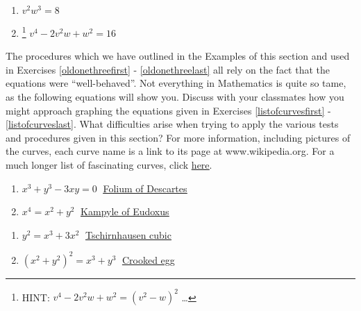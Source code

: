 \begin{multicols}{2}
\begin{enumerate}
\setcounter{enumi}{\value{HW}}

\item  $v^2w^3 = 8$
\item \hspace{-.1in}\footnote{HINT: $v^4 - 2v^2 w + w^2 = \left(v^2 - w \right)^2$ \ldots} $v^4 - 2v^2 w + w^2 = 16$  \label{vwlastrelation}

\setcounter{HW}{\value{enumi}}
\end{enumerate}
\end{multicols}

The procedures which we have outlined in the Examples of this section and used in Exercises \ref{oldonethreefirst} -  \ref{oldonethreelast} all rely on the fact that the equations were ``well-behaved''.  Not everything in Mathematics is quite so tame, as the following equations will show you.  Discuss with your classmates how you might approach graphing the equations given in Exercises \ref{listofcurvesfirst} - \ref{listofcurveslast}.  What difficulties arise when trying to apply the various tests and procedures given in this section?  For more information, including pictures of the curves, each curve name is a link to its page at www.wikipedia.org.  For a much longer list of fascinating curves, click \href{http://en.wikipedia.org/wiki/List_of_curves}{\underline{here}}.


\begin{multicols}{2}
\begin{enumerate}
\setcounter{enumi}{\value{HW}}

\item \label{listofcurvesfirst} $x^{3} + y^{3} - 3xy = 0\;$ \href{http://en.wikipedia.org/wiki/Folium_of_descartes}{\underline{Folium of Descartes}}
\item $x^{4} = x^{2} + y^{2}\;$ \href{http://en.wikipedia.org/wiki/Kampyle_of_Eudoxus}{\underline{Kampyle of Eudoxus}}
\setcounter{HW}{\value{enumi}}
\end{enumerate}
\end{multicols}

\begin{multicols}{2}
\begin{enumerate}
\setcounter{enumi}{\value{HW}}


\item $y^{2} = x^{3} + 3x^{2}\;$ \href{http://en.wikipedia.org/wiki/Tschirnhausen_cubic}{\underline{Tschirnhausen cubic}}
\item \label{listofcurveslast} $(x^{2} + y^{2})^{2} = x^{3} + y^{3}\;$ \href{https://en.wikipedia.org/wiki/File:Crooked_egg_curve.svg}{\underline{Crooked egg}} 

\setcounter{HW}{\value{enumi}}
\end{enumerate}
\end{multicols}

